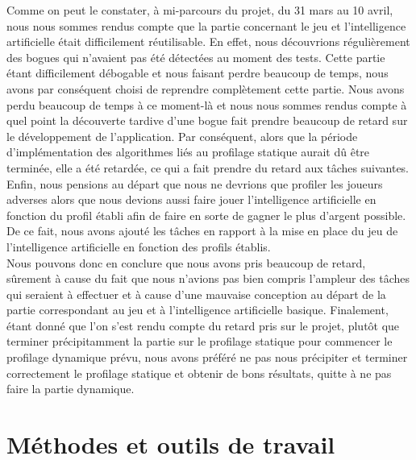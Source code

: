 \documentclass{report}
\begin{document}
Comme on peut le constater, à mi-parcours du projet, du 31 mars au 10 avril, nous nous sommes rendus compte que la partie concernant le jeu et l'intelligence artificielle était difficilement réutilisable. En effet, nous découvrions régulièrement des bogues qui n'avaient pas été détectées au moment des tests. Cette partie étant difficilement débogable et nous faisant perdre beaucoup de temps, nous avons par conséquent choisi de reprendre complètement cette partie. Nous avons perdu beaucoup de temps à ce moment-là et nous nous sommes rendus compte à quel point la découverte tardive d'une bogue fait prendre beaucoup de retard sur le développement de l'application. Par conséquent, alors que la période d'implémentation des algorithmes liés au profilage statique aurait dû être terminée, elle a été retardée, ce qui a fait prendre du retard aux tâches suivantes.\\

Enfin, nous pensions au départ que nous ne devrions que profiler les joueurs adverses alors que nous devions aussi faire jouer l'intelligence artificielle en fonction du profil établi afin de faire en sorte de gagner le plus d'argent possible. De ce fait, nous avons ajouté les tâches en rapport à la mise en place du jeu de l'intelligence artificielle en fonction des profils établis. \\

Nous pouvons donc en conclure que nous avons pris beaucoup de retard, sûrement à cause du fait que nous n'avions pas bien compris l'ampleur des tâches qui seraient à effectuer et à cause d'une mauvaise conception au départ de la partie correspondant au jeu et à l'intelligence artificielle basique. Finalement, étant donné que l'on s'est rendu compte du retard pris sur le projet, plutôt que terminer précipitamment la partie sur le profilage statique pour commencer le profilage dynamique prévu, nous avons préféré ne pas nous précipiter et terminer correctement le profilage statique et obtenir de bons résultats, quitte à ne pas faire la partie dynamique. \par

\section{Méthodes et outils de travail}
\end{document}
